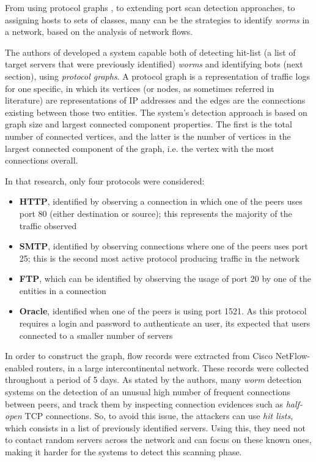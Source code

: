 \documentclass[runningheads,a4paper]{llncs}
\begin{document}
From using protocol graphs \cite{Collins2007}, to extending port scan detection approaches, to assigning hosts to sets of classes, many can be the strategies to identify \textit{worms} in a network, based on the analysis of network flows.  

The authors of \cite{Collins2007} developed a system capable both of detecting hit-list (a list of target servers that were previously identified) \textit{worms} and identifying bots (next section), using \emph{protocol graphs}. A protocol graph 
is a representation of traffic logs for one specific, in which its vertices (or nodes, as sometimes referred in literature) are representations of IP addresses and the edges are the connections existing between those two entities. The system's detection approach is based on graph size and largest connected component properties. The first is the total number of connected vertices, and the latter is the number of vertices in the largest connected component of the graph, i.e. the vertex with the most connections overall.

In that research, only four protocols were considered:
\begin{itemize}
	\item \textbf{HTTP}, identified by observing a connection in which one of the peers uses port 80 (either destination or source); this represents the majority of the traffic observed
	\item \textbf{SMTP}, identified by observing connections where one of the peers uses port 25; this is the second most active protocol producing traffic in the network
	\item \textbf{FTP}, which can be identified by observing the usage of port 20 by one of the entities in a connection
	\item \textbf{Oracle}, identified when one of the peers is using port 1521. As this protocol requires a login and password to authenticate an user, its expected that users connected to a smaller number of servers 
\end{itemize}


In order to construct the graph, flow records were extracted from Cisco NetFlow-enabled routers, in a large intercontinental network. These records were collected throughout a period of 5 days. 
As stated by the authors, many \textit{worm} detection systems  on the  detection of an unusual high number of frequent connections between peers, and track them by inspecting connection evidences such as \textit{half-open} TCP connections. So, to avoid this issue, the attackers can use \textit{hit lists}, which consists in a list of previously identified servers. Using this, they need not to contact random servers across the network and can focus on these known ones, making it harder for the systems to detect this scanning phase. 
\end{document}
